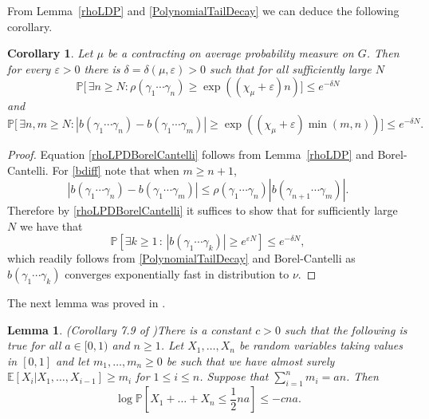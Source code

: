 \documentclass[10pt, english,oneside,reqno]{amsart}
\theoremstyle{plain}
\newtheorem{corollary}[theorem]{Corollary}
\newtheorem{lemma}[theorem]{Lemma}
\theoremstyle{remark}
\numberwithin{equation}{section}
\numberwithin{figure}{section}
\newcommand{\eps}{\varepsilon}
\newcommand{\E}{\mathbb{E}}
\begin{document}
From Lemma~\ref{rhoLDP} and \eqref{PolynomialTailDecay} we can deduce the following corollary.

\begin{corollary} \label{coro:decay_estimates}
    Let $\mu$ be a contracting on average probability measure on $G$. Then for every $\eps > 0$ there is $\delta = \delta(\mu,\eps) > 0$ such that for all sufficiently large $N$
    \begin{equation}\label{rhoLPDBorelCantelli}
        \mathbb{P}\Big[ \, \exists n \geq N : \rho(\gamma_1 \cdots \gamma_n) \geq \exp( (\chi_{\mu} + \eps) n) \Big] \leq e^{-\delta N}
    \end{equation}
    and
    \begin{equation*}\label{bdiff}
        \mathbb{P}\Big[ \, \exists n, m \geq N : |b(\gamma_1 \cdots \gamma_n) - b(\gamma_1 \cdots \gamma_m)| \geq \exp( (\chi_{\mu} + \eps) \min(m, n)) \Big] \leq e^{-\delta N}.
    \end{equation*}
\end{corollary}

\begin{proof}
    Equation \eqref{rhoLPDBorelCantelli} follows from Lemma~\ref{rhoLDP} and Borel-Cantelli. For \eqref{bdiff} note that when $m \geq n + 1$, $$|b(\gamma_1 \cdots \gamma_n) - b(\gamma_1 \cdots \gamma_m)| \leq  \rho(\gamma_1\cdots \gamma_n)|b(\gamma_{n + 1}\cdots \gamma_m)|.$$ Therefore by \eqref{rhoLPDBorelCantelli} it suffices to show that for sufficiently large $N$ we have that $$\mathbb{P}[\exists k \geq 1 \,:\, |b(\gamma_1\cdots \gamma_k)| \geq e^{\eps N} ] \leq e^{-\delta N},$$ which readily follows from \eqref{PolynomialTailDecay} and Borel-Cantelli as $b(\gamma_1\cdots \gamma_k)$ converges exponentially fast in distribution to $\nu$.
\end{proof}

The next lemma was proved in \cite{Kittle2023}.

\begin{lemma}(Corollary 7.9 of \cite{Kittle2023})\label{EffectiveCramerR}
    There is a constant $c > 0$ such that the following is true for all $a \in [0,1)$ and $n\geq 1$. Let $X_1, \ldots , X_n$ be random variables taking values in $[0,1]$ and  let $m_1, \ldots , m_n \geq 0$ be such that we have almost surely
    $\E[X_i | X_1 , \ldots , X_{i-1}] \geq m_i$ for $1 \leq i \leq n$. Suppose that $\sum_{i = 1}^n m_i = an$. Then $$\log \mathbb{P}\left[X_1 + \ldots + X_n \leq \frac{1}{2}na\right] \leq - cna.$$
\end{lemma}
\end{document}
